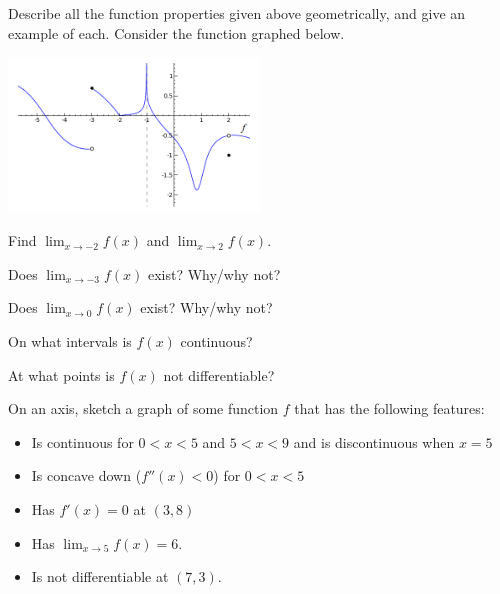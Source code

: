 \begin{questions}
  \question Describe all the function properties given above geometrically, and give an example of each.
  \question Consider the function graphed below.

            \begin{center}
              \includegraphics[width=0.5\textwidth]{limits3}
            \end{center}
    \begin{parts}
      \item Find $ \lim_{x \to -2} f(x) $ and $ \lim_{x \to 2} f(x) $.
      \item Does $ \lim_{x \to -3} f(x) $ exist? Why/why not?
      \item Does $ \lim_{x \to 0} f(x) $ exist? Why/why not?
      \item On what intervals is $ f(x) $ continuous?
      \item At what points is $ f(x) $ not differentiable?
    \end{parts}
  \question On an axis, sketch a graph of some function $ f $ that has the following features:
            \begin{itemize}[noitemsep]
              \item Is continuous for $ 0 < x < 5 $ and $ 5 < x < 9 $ and is discontinuous when $ x = 5 $
              \item Is concave down ($f''(x) < 0 $) for $ 0 < x < 5 $
              \item Has $ f'(x) = 0 $ at $ (3, 8) $
              \item Has $ \lim_{x \to 5} f(x) = 6 $.
              \item Is not differentiable at $ (7, 3) $.
            \end{itemize}
\end{questions}

